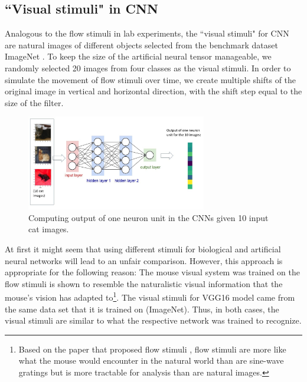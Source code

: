 \subsection{``Visual stimuli" in CNN}
Analogous to the flow stimuli in lab experiments, the ``visual stimuli" for CNN are natural images of different objects selected from the benchmark dataset ImageNet \cite{deng2009imagenet}. To keep the size of the artificial neural tensor manageable, we randomly selected 20 images from four classes as the visual stimuli. In order to simulate the movement of flow stimuli over time, we create multiple shifts of the original image in vertical and horizontal direction, with the shift step equal to the size of the filter. 
    \begin{figure}[H]
        \centering
            \includegraphics[width=0.7\textwidth]{figures/artificial/artificial-input-output.jpg}
            \caption{Computing output of one neuron unit in the CNNs given 10 input cat images.}
    \end{figure}
    
\begin{rmk}
At first it might seem that using different stimuli for biological and artificial neural networks will lead to an unfair comparison. However, this approach is appropriate for the following reason: The mouse visual system was trained on the flow stimuli is shown to resemble the naturalistic visual information that the mouse's vision has adapted to\footnote{Based on the paper that proposed flow stimuli \cite{visual-flow}, flow stimuli are more like what the mouse would encounter in the natural world than are sine-wave gratings but is more tractable for analysis than are natural images.}. The visual stimuli for VGG16 model came from the same data set that it is trained on (ImageNet). Thus, in both cases, the visual stimuli are similar to what the respective network was trained to recognize.
\end{rmk}
 
